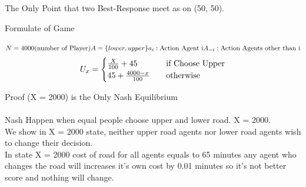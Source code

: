 \documentclass[
  course = {{IE579 Game Theory and Multi-Agent Reinforcement Learning}},
  assignment = 1,
  name = {{Mohammad Mahdi Rahimi}},
  studentnumber = {{20208244}},
  email = {{mahi@kaist.ac.kr}},
  firstexercise = 1
]{aga-homework}
\begin{document}
\begin{center}
\end{center}
The Only Point that two Best-Response meet as on (50, 50).


\exercise
\subexercise Formulate of Game
\\\\
$
N = 4000 \text{(number of Player)}\\\\
A = \{lower, upper\}
a_i: \text{Action Agent i} \\\\
A_{-i}: \text{Action Agents other than i} \\\\
$
\[
U_{x} = 
     \begin{cases}
      {\frac{X}{100}} + 45 &\quad\text {if Choose Upper} \\
      45 + {4000 - x \over 100} &\quad\text{otherwise}\\ 
     \end{cases}
\]

\subexercise Proof (X = 2000) is the Only Nash Equilibrium \\\\
Nash Happen when equal people choose upper and lower road. X = 2000.\\
We show in X = 2000 state, neither upper road agents nor lower road agents wish to change their decision.\\
In state X = 2000 cost of road for all agents equals to 65 minutes any agent who changes the road will increases it's own cost by 0.01 minutes so it's not better score and nothing will change.
\begin{center}
\end{center}
\end{document}
